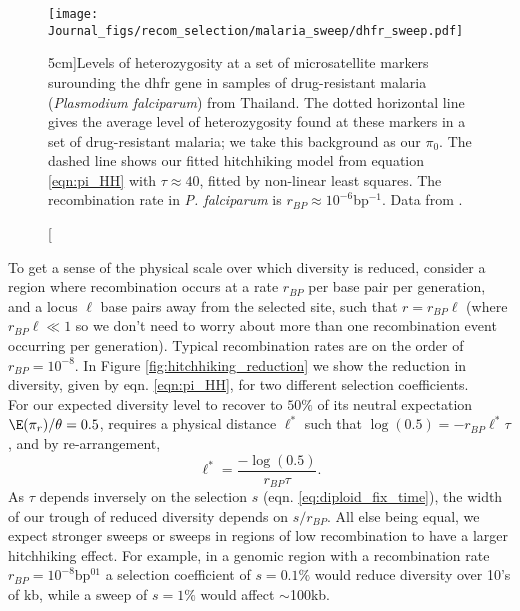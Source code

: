 \begin{figure}
\begin{center}
\texttt{[image: Journal\_figs/recom\_selection/malaria\_sweep/dhfr\_sweep.pdf]}
\end{center}
\caption[][5cm]{Levels of heterozygosity at a set of microsatellite markers
  surounding the dhfr gene in samples of drug-resistant malaria ({\it Plasmodium falciparum}) from
  Thailand. The dotted horizontal line gives the average level of
  heterozygosity found at these markers in a set of drug-resistant
  malaria; we take this background as our $\pi_0$. The dashed line shows
  our fitted hitchhiking model from equation \ref{eqn:pi_HH} with $\tau \approx 40$, fitted by
  non-linear least squares. The recombination rate in {\it P.
    falciparum} is $r_{BP}\approx 10^{-6}$bp$^{-1}$. Data from
  \citet{nash2005selection}. } \label{fig:hitchhiking_malaria}
\end{figure}


To get a sense of the physical scale over which diversity is reduced,
consider a region where recombination occurs at a rate $r_{BP}$ per
base pair per generation, and a locus $ \ell $ base pairs away from the
selected site, such that $r=r_{BP } \ell $ (where $r_{BP}  \ell  \ll 1$ so we don't need to
worry about more than one recombination event occurring per
generation). Typical
recombination rates are on the order of $r_{BP} = 10^{-8}$. In Figure
\ref{fig:hitchhiking_reduction} we show the reduction in diversity,
given by eqn. \eqref{eqn:pi_HH}, for two different selection coefficients.\\ 

For our expected diversity level to recover to $50\%$ of
its neutral expectation $\E(\pi_r)/\theta=0.5$, requires a physical
distance $\ell^{*}$ such that $\log(0.5) = -r_{BP} \ell ^*\tau$, and by re-arrangement,
\begin{equation}
\ell^* = \frac{-\log(0.5)}{r_{BP} \tau }.
\end{equation}
As
$\tau$ depends inversely on the selection $s$ (eqn. \eqref{eq:diploid_fix_time}), the width of our trough of reduced diversity depends on $s/r_{BP}$.
All else being equal, we expect stronger sweeps or sweeps in regions of low
recombination to have a larger hitchhiking effect. For example, in a genomic region with a recombination rate $r_{BP}=10^{-8}$bp$^{01}$ a selection coefficient of $s=0.1\%$ would reduce
diversity over 10's of kb, while a sweep of $s=1\%$ would affect
$\sim$100kb.   \\


